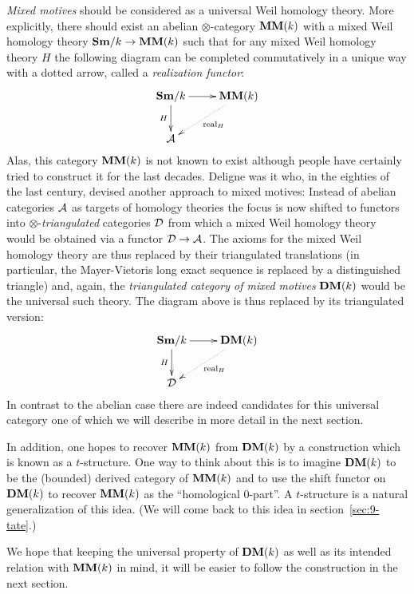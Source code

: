\emph{Mixed motives} should be considered as a universal Weil homology
theory. More explicitly, there should exist an abelian
$\otimes$-category $\mathbf{MM}(k)$ with a mixed Weil homology theory
$\mathbf{Sm}/k\to\mathbf{MM}(k)$ such that for any mixed Weil homology theory $H$ the
following diagram can be completed commutatively in a unique way with
a dotted arrow, called a \emph{realization functor}:
\begin{equation*}
  \xymatrix{\Sm/k\ar[d]_{H}\ar[r]&\MM(k)\ar@{.>}[ld]^{\mathrm{real}_{H}}\\
    {\cal A}}
\end{equation*}
Alas, this category $\mathbf{MM}(k)$ is not known to exist although people
have certainly tried to construct it for the last decades. Deligne was
it who, in the eighties of the last century, devised another approach
to mixed motives: Instead of abelian categories ${\cal A}$ as targets
of homology theories the focus is now shifted to functors into
$\otimes$-\emph{triangulated} categories ${\cal D}$ from which a mixed
Weil homology theory would be obtained via a functor ${\cal D}\to{\cal
  A}$. The axioms for the mixed Weil homology theory are thus replaced
by their triangulated translations (in particular, the Mayer-Vietoris
long exact sequence is replaced by a distinguished triangle) and,
again, the \emph{triangulated category of mixed motives} $\mathbf{DM}(k)$
would be the universal such theory. The diagram above is thus replaced
by its triangulated version:
\begin{equation*}
  \xymatrix{\Sm/k\ar[d]_{H}\ar[r]&\DM(k)\ar@{.>}[ld]^{\mathrm{real}_{H}}\\
    {\cal D}}  
\end{equation*}
In contrast to the abelian case there are indeed candidates for this
universal category one of which we will describe in more detail in the
next section.

In addition, one hopes to recover $\mathbf{MM}(k)$ from $\mathbf{DM}(k)$ by a
construction which is known as a $t$-structure. One way to think about
this is to imagine $\mathbf{DM}(k)$ to be the (bounded) derived category of
$\mathbf{MM}(k)$ and to use the shift functor on $\mathbf{DM}(k)$ to recover $\mathbf{MM}(k)$
as the ``homological 0-part''. A $t$-structure is a natural
generalization of this idea. (We will come back to this idea in
section~\ref{sec:9-tate}.)

We hope that keeping the universal property of $\mathbf{DM}(k)$ as well as its
intended relation with $\mathbf{MM}(k)$ in mind, it will be easier to follow
the construction in the next section.

